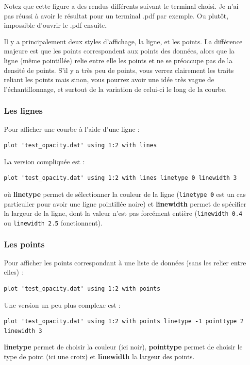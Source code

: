 \documentclass[a4paper,twoside]{article}
\begin{document}
Notez que cette figure a des rendus différents suivant le terminal choisi. Je n'ai pas réussi à avoir le résultat pour un terminal .pdf par exemple. Ou plutôt, impossible d'ouvrir le .pdf ensuite.

\bigskip

Il y a principalement deux styles d'affichage, la ligne, et les points. La différence majeure est que les points correspondent aux points des données, alors que la ligne (même pointillée) relie entre elle les points et ne se préoccupe pas de la densité de points. S'il y a très peu de points, vous verrez clairement les traits reliant les points mais sinon, vous pourrez avoir une idée très vague de l'échantillonnage, et surtout de la variation de celui-ci le long de la courbe.

\subsubsection{Les lignes}
Pour afficher une courbe à l'aide d'une ligne : 
\begin{verbatim}
plot 'test_opacity.dat' using 1:2 with lines
\end{verbatim}

La version compliquée est :
\begin{verbatim}
plot 'test_opacity.dat' using 1:2 with lines linetype 0 linewidth 3 
\end{verbatim}
où \textbf{linetype} permet de sélectionner la couleur de la ligne (\texttt{linetype 0} est un cas particulier pour avoir une ligne pointillée noire) et \textbf{linewidth} permet de spécifier la largeur de la ligne, dont la valeur n'est pas forcément entière (\texttt{linewidth 0.4} ou \texttt{linewidth 2.5} fonctionnent).

\subsubsection{Les points}
Pour afficher les points correspondant à une liste de données (sans les relier entre elles) :
\begin{verbatim}
plot 'test_opacity.dat' using 1:2 with points
\end{verbatim}

Une version un peu plus complexe est :
\begin{verbatim}
plot 'test_opacity.dat' using 1:2 with points linetype -1 pointtype 2 linewidth 3
\end{verbatim}
\textbf{linetype} permet de choisir la couleur (ici noir), \textbf{pointtype} permet de choisir le type de point (ici une croix) et \textbf{linewidth} la largeur des points. 
\end{document}
